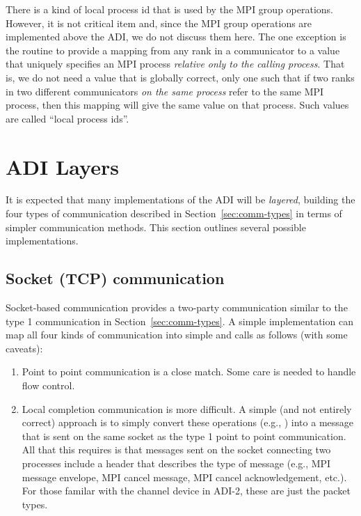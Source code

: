 {There is a kind of local process id that is used by the MPI group
operations.  However, it is not critical item and, since the MPI group
operations are implemented above the ADI, we do not discuss them here.
The one exception is the routine to provide a mapping from any
rank in a communicator to a value that uniquely specifies an MPI
process \emph{relative only to the calling process}.  That is, we do
not need a value that is globally correct, only one such that if two
ranks in two different communicators \emph{on the same process} refer
to the same MPI process, then this mapping will give the same value on
that process.  Such values are called ``local process ids''.

\section{ADI Layers}
\label{sec:layers}

It is expected that many implementations of the ADI will be \emph{layered},
building the four types of communication described in
Section~\ref{sec:comm-types} in terms of simpler communication methods.
This section outlines several possible implementations.

\subsection{Socket (TCP) communication}
Socket-based communication provides a two-party communication similar
to the type 1 communication in Section~\ref{sec:comm-types}.  A simple
implementation can map all four kinds of communication into simple
 and  calls as follows (with some caveats):
\begin{enumerate}
\item Point to point communication is a close match.  Some care is
needed to handle flow control.

\item Local completion communication is more difficult.  A simple (and
not entirely correct) approach is to simply convert these operations
(e.g., ) into a message that is sent on the
same socket as the type 1 point to point communication.  All that this
requires is that messages sent on the socket connecting two processes
include a header that describes the type of message (e.g., MPI message
envelope, MPI cancel message, MPI cancel acknowledgement, etc.).  For
those familar with the channel device in ADI-2, these are just the
packet types.


\end{enumerate}}
